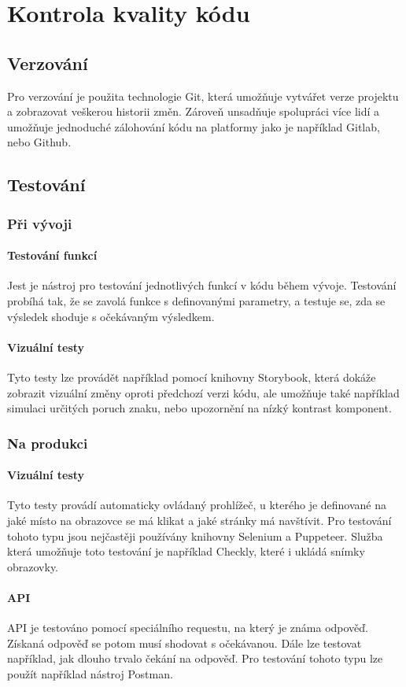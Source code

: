 \chapter{Kontrola kvality kódu}
\section{Verzování}
Pro verzování je použita technologie Git,
která umožňuje vytvářet verze projektu
a zobrazovat veškerou historii změn.
Zároveň unsadňuje spolupráci více lidí a umožňuje
jednoduché zálohování kódu na platformy jako je
například Gitlab, nebo Github.

\section{Testování}
\subsection{Při vývoji} 
\subsubsection{Testování funkcí}
Jest je nástroj pro testování jednotlivých funkcí v kódu během vývoje.
Testování probíhá tak, že se zavolá funkce s definovanými parametry,
a testuje se, zda se výsledek shoduje s očekávaným výsledkem.
\subsubsection{Vizuální testy}
Tyto testy lze provádět například pomocí knihovny Storybook, která dokáže 
zobrazit vizuální změny oproti předchozí verzi kódu, ale umožňuje také například
simulaci určitých poruch znaku, nebo upozornění na nízký kontrast komponent.
\subsection{Na produkci} 
\subsubsection{Vizuální testy}
Tyto testy provádí automaticky ovládaný prohlížeč, u kterého je 
definované na jaké místo na obrazovce se má klikat a jaké stránky má navštívit.
Pro testování tohoto typu jsou nejčastěji používány knihovny Selenium a Puppeteer.
Služba která umožňuje toto testování je například Checkly, které i ukládá snímky obrazovky.
\subsubsection{API}
API je testováno pomocí speciálního requestu, na který je známa odpověď. Získaná
odpověď se potom musí shodovat s očekávanou. Dále lze testovat například, jak dlouho
trvalo čekání na odpověď. Pro testování tohoto typu lze použít
například nástroj Postman.
